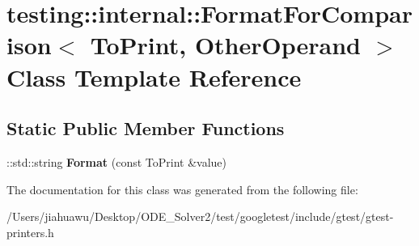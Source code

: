 \hypertarget{classtesting_1_1internal_1_1_format_for_comparison}{}\section{testing\+:\+:internal\+:\+:Format\+For\+Comparison$<$ To\+Print, Other\+Operand $>$ Class Template Reference}
\label{classtesting_1_1internal_1_1_format_for_comparison}
\subsection*{Static Public Member Functions}
\begin{DoxyCompactItemize}
\item 
\mbox{\label{classtesting_1_1internal_1_1_format_for_comparison_a2aeb688fc55b57abd3021d82eccad896}} 
\+::std\+::string {\bfseries Format} (const To\+Print \&value)
\end{DoxyCompactItemize}


The documentation for this class was generated from the following file\+:\begin{DoxyCompactItemize}
\item 
/\+Users/jiahuawu/\+Desktop/\+O\+D\+E\+\_\+\+Solver2/test/googletest/include/gtest/gtest-\/printers.\+h\end{DoxyCompactItemize}
